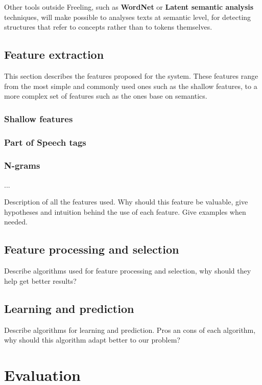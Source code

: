 \documentclass[12pt]{article}
\begin{document}
Other tools outside Freeling, such as \textbf{WordNet} or \textbf{Latent semantic analysis} techniques, will make possible to analyses texts at semantic level, for detecting structures that refer to concepts rather than to tokens themselves.\\


\subsection{Feature extraction}
This section describes the features proposed for the system. These features range from the most simple and commonly used ones such as the shallow features, to a more complex set of features such as the ones base on semantics.

\subsubsection*{Shallow features}
\subsubsection*{Part of Speech tags}

\subsubsection*{N-grams}

...

Description of all the features used. Why should this feature be valuable, give hypotheses and intuition behind the use of each feature. Give examples when needed.

\subsection{Feature processing and selection}
Describe algorithms used for feature processing and selection, why should they help get better results?

\subsection{Learning and prediction}
Describe algorithms for learning and prediction. Pros an cons of each algorithm, why should this algorithm adapt better to our problem?

\section{Evaluation}
\end{document}

